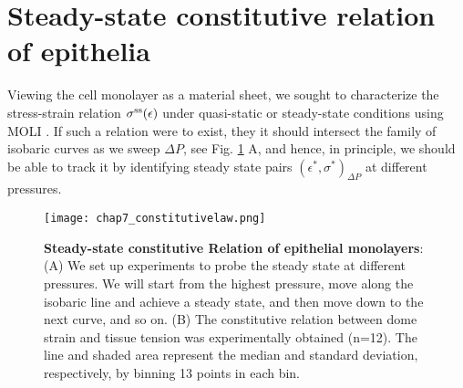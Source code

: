 \hypertarget{constitutive-relation-of-epithelia}{%
	\section{Steady-state constitutive relation of
		epithelia}\label{constitutive-relation-of-epithelia}}

Viewing the cell monolayer as a material sheet, we sought to characterize the stress-strain relation $\sigma^{\rm ss}(\epsilon)$ under quasi-static or steady-state conditions using MOLI \cite{latorre2018,duque2023}. If such a relation were to exist, they it should intersect the family of isobaric curves as we sweep $\Delta P$, see Fig. \ref{fig_7_5} A, and hence, in principle, we should be able to track it by identifying steady state pairs  $(\epsilon^*, \sigma^*)_{\Delta P}$ at different pressures.

\begin{figure}[h!]
	\centering
	\texttt{[image: chap7\_constitutivelaw.png]}
	\caption{\label{fig_7_5}
		\textbf{Steady-state constitutive Relation of epithelial monolayers}: (A) We set up experiments to probe the steady state at different pressures. We will start from the highest pressure, move along the isobaric line and achieve a steady state, and then move down to the next curve, and so on.	(B) The constitutive relation between dome strain and tissue tension was experimentally obtained (n=12). The line and shaded area represent the median and standard deviation, respectively, by binning 13 points in each bin.}
\end{figure}

